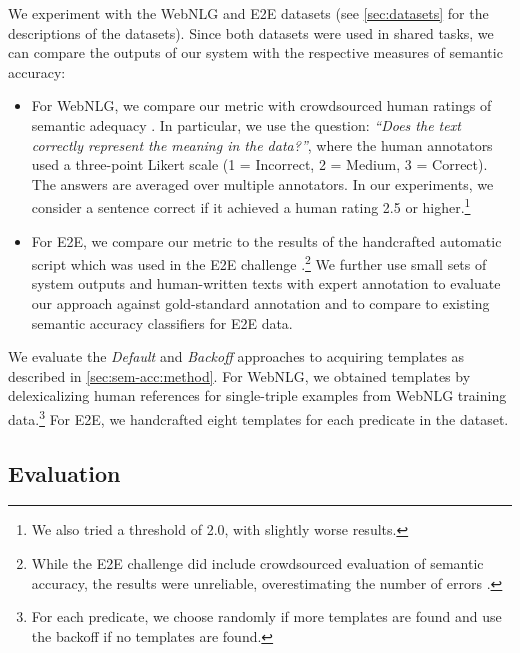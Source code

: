 We experiment with the WebNLG and E2E datasets (see \autoref{sec:datasets} for the descriptions of the datasets). Since both datasets were used in shared tasks, we can compare the outputs of our system with the respective measures of semantic accuracy:
\begin{itemize}
    \item For WebNLG, we compare our metric with crowdsourced human ratings of semantic adequacy \cite{shimorinaWebNLGChallengeHuman2019}. In particular, we use the question: \textit{``Does the text correctly represent the meaning in the data?''}, where the human annotators used a three-point Likert scale (1 = Incorrect, 2 = Medium, 3 = Correct). The answers are averaged over multiple annotators. In our experiments, we consider a sentence correct if it achieved a human rating 2.5 or higher.\footnote{We also tried a threshold of 2.0, with slightly worse results.}
    \item For E2E, we compare our metric to the results of the handcrafted automatic script which was used in the E2E challenge \cite{dusekEvaluatingStateoftheartEndtoEnd2020}.\footnote{While the E2E challenge did include crowdsourced evaluation of semantic accuracy, the results were unreliable, overestimating the number of errors \cite{dusekEvaluatingStateoftheartEndtoEnd2020}.} We further use small sets of system outputs and human-written texts with expert annotation \citep[provided by][]{dusekSemanticNoiseMatters2019} to evaluate our approach against gold-standard annotation and to compare to existing semantic accuracy classifiers for E2E data.
\end{itemize}


We evaluate the \emph{Default} and \emph{Backoff} approaches to acquiring templates as described in \autoref{sec:sem-acc:method}. For WebNLG, we obtained templates by delexicalizing human references for single-triple examples from WebNLG training data.\footnote{For each predicate, we choose randomly if more templates are found and use the backoff if no templates are found.} For E2E, we handcrafted eight templates for each predicate in the dataset.

\subsection{Evaluation}
\label{sec:sem-acc:evaluation}

